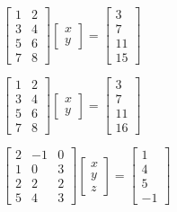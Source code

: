 \documentclass{article}
\begin{document}
$\left[ 
\begin{array}{cc}
1 & 2 \\ 
3 & 4 \\ 
5 & 6 \\ 
7 & 8%
\end{array}%
\right] \left[ 
\begin{array}{c}
x \\ 
y%
\end{array}%
\right] =\left[ 
\begin{array}{r}
3 \\ 
7 \\ 
11 \\ 
15%
\end{array}%
\right] $

$\left[ 
\begin{array}{cc}
1 & 2 \\ 
3 & 4 \\ 
5 & 6 \\ 
7 & 8%
\end{array}%
\right] \left[ 
\begin{array}{c}
x \\ 
y%
\end{array}%
\right] =\left[ 
\begin{array}{r}
3 \\ 
7 \\ 
11 \\ 
16%
\end{array}%
\right] $

$\left[ 
\begin{array}{rrr}
2 & -1 & 0 \\ 
1 & 0 & 3 \\ 
2 & 2 & 2 \\ 
5 & 4 & 3%
\end{array}%
\right] \left[ 
\begin{array}{c}
x \\ 
y \\ 
z%
\end{array}%
\right] =\left[ 
\begin{array}{c}
1 \\ 
4 \\ 
5 \\ 
-1%
\end{array}%
\right] $
\end{document}
